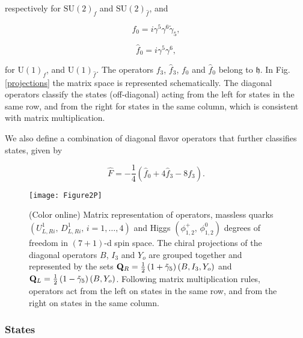 \documentclass[12pt]{article}
\renewcommand\[{\begin{dmath}}
\renewcommand\]{\end{dmath}}
\begin{document}
\noindent respectively for $\textrm{SU}(2)_{f}$ and $\textrm{SU}(2)_{\hat{f}}$,
and

\begin{equation}
f_{0}=i\gamma^{5}\gamma^{6}\tilde{\gamma}_{5},\label{eq:2.5.10}
\end{equation}

\begin{equation}
\hat{f}_{0}=i\gamma^{5}\gamma^{6},\label{eq:2.5.11}
\end{equation}

\noindent for $\textrm{U}(1)_{f}$, and $\textrm{U}(1)_{\hat{f}}$.
The operators $f_{3}$, $\hat{f}_{3}$, $f_{0}$ and $\hat{f}_{0}$
belong to $\mathfrak{h}$. In Fig. \ref{projections} the matrix space is
represented schematically. The diagonal operators classify the states (off-diagonal)
acting from the left for states in the same row, and from the right
for states in the same column, which is consistent with matrix multiplication.


We also define a combination of diagonal flavor operators that further classifies states, given by

\begin{equation}
\hat{F}=-\dfrac{1}{4}\left(\hat{f}_{0}+4\hat{f}_{3}-8f_{3}\right). \label{eq: Fop}
\end{equation}

\begin{figure}[H]
\begin{centering}
\texttt{[image: Figure2P]}
\par\end{centering}
\caption{(Color online) Matrix representation of operators, massless quarks
$\left(U_{L,Ri}^{1},\,D_{L,Ri}^{1},\,i=1,\ldots,4\right)$ and Higgs
$\left(\phi_{1,2}^{+},\,\phi_{1,2}^{0}\right)$ degrees of freedom
in $\left(7+1\right)$-d spin space. The chiral projections of the
diagonal operators $B$, $I_{3}$ and $Y_o$ are grouped together and
represented by the sets ${\bf Q}_{R}=\frac{1}{2}\left(1+\tilde{\gamma}_{5}\right)\left(B,I_{3},Y_o\right)$
and ${\bf Q}_{L}=\frac{1}{2}\left(1-\tilde{\gamma}_{5}\right)\left(B,Y_o\right)$.
Following matrix multiplication rules, operators act from the left
on states in the same row, and from the right on states in the same
column.} \label{states}
\end{figure}


\subsubsection{States}
\end{document}
